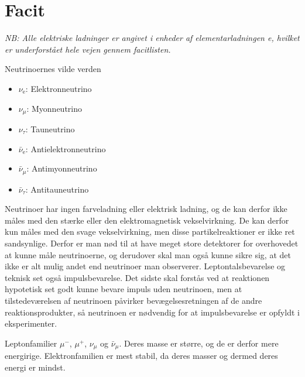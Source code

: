 \section{Facit}

\setcounter{opgave}{0}

\emph{NB: Alle elektriske ladninger er angivet i enheder af elementarladningen \si{\elementarycharge}, hvilket er underforstået hele vejen gennem facitlisten.}\\

\begin{opgave}{Neutrinoernes vilde verden}
    \begin{itemize}
        \item $\nu_\mathrm{e}$: Elektronneutrino
        \item $\nu_\mu$: Myonneutrino
        \item $\nu_\tau$: Tauneutrino
        \item $\bar{\nu}_\mathrm{e}$: Antielektronneutrino
        \item $\bar{\nu}_\mu$: Antimyonneutrino
        \item $\bar{\nu}_\tau$: Antitauneutrino
    \end{itemize}
    \opg Neutrinoer har ingen farveladning eller elektrisk ladning, og de kan derfor ikke måles med den stærke eller den elektromagnetisk vekselvirkning. De kan derfor kun måles med den svage vekselvirkning, men disse partikelreaktioner er ikke ret sandsynlige. Derfor er man nød til at have meget store detektorer for overhovedet at kunne måle neutrinoerne, og derudover skal man også kunne sikre sig, at det ikke er alt mulig andet end neutrinoer man observerer.
    \opg Leptontalsbevarelse og teknisk set også impulsbevarelse. Det sidste skal forstås ved at reaktionen hypotetisk set godt kunne bevare impuls uden neutrinoen, men at tilstedeværelsen af neutrinoen påvirker bevægelsesretningen af de andre reaktionsprodukter, så neutrinoen er nødvendig for at impulsbevarelse er opfyldt i eksperimenter.
\end{opgave}

\begin{opgave}{Leptonfamilier}
    \opg $\mu^-$, $\mu^+$, $\nu_\mu$ og $\bar{\nu}_\mu$.
    \opg Deres masse er større, og de er derfor mere energirige.
    \opg Elektronfamilien er mest stabil, da deres masser og dermed deres energi er mindst.
\end{opgave}

